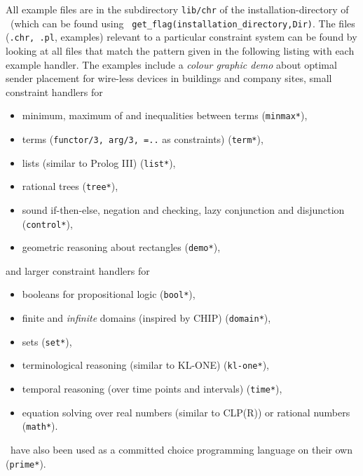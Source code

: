 All example files are in the subdirectory {\tt lib/chr} of the
installation-directory of \eclipse\ (which can be found using {\tt
get\_flag(installation\_directory,Dir)}.  
The files ({\tt .chr, .pl}, examples)
relevant to a
particular constraint system can be found by looking at all files that
match the pattern given in the following listing with each example
handler.  The examples include a {\em colour graphic demo} about
optimal sender placement for wire-less devices in buildings and
company sites, small constraint handlers for
\begin{itemize}
\item minimum, maximum of and inequalities between terms ({\tt *minmax*}),
\item terms ({\tt functor/3, arg/3, =..} as constraints) ({\tt *term*}),
\item lists (similar to Prolog III) ({\tt *list*}),
\item rational trees ({\tt *tree*}),
\item sound if-then-else, negation and checking, 
        lazy conjunction and disjunction ({\tt *control*}),
\item geometric reasoning about rectangles ({\tt *demo*}),
\end{itemize}
\noindent and larger constraint handlers for
\begin{itemize}
\item booleans for propositional logic ({\tt *bool*}),
\item finite and {\em infinite} domains (inspired by CHIP) ({\tt *domain*}),
\item sets ({\tt *set*}),
\item terminological reasoning (similar to KL-ONE) \cite{fru93b} ({\tt *kl-one*}),
\item temporal reasoning (over time points and intervals) \cite{fru93} ({\tt *time*}),
\item equation solving over real numbers (similar to CLP(R)) or rational numbers ({\tt *math*}).
\end{itemize}
\chrs\ have also been used as a committed choice programming language
on their own ({\tt *prime*}).

